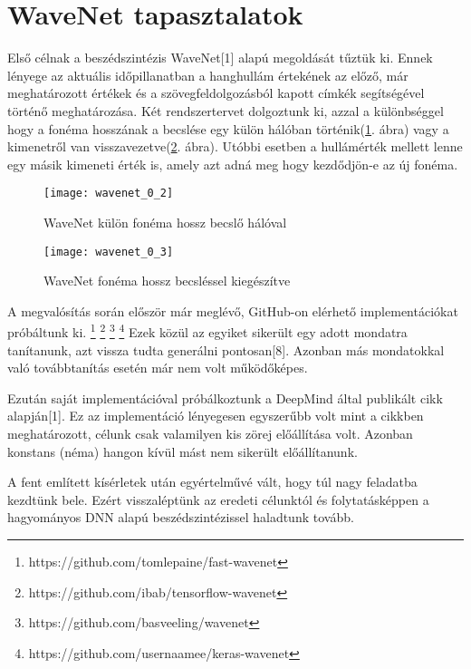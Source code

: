 \section{WaveNet tapasztalatok}

Első célnak a beszédszintézis WaveNet[1] alapú megoldását tűztük ki. Ennek lényege az aktuális időpillanatban a hanghullám értekének az előző, már meghatározott értékek és a szövegfeldolgozásból kapott címkék segítségével történő meghatározása. Két rendszertervet dolgoztunk ki, azzal a különbséggel hogy a fonéma hosszának a becslése egy külön hálóban történik(\ref{wavenet-1}. ábra) vagy a kimenetről van visszavezetve(\ref{wavenet-2}. ábra). Utóbbi esetben a hullámérték mellett lenne egy másik kimeneti érték is, amely azt adná meg hogy kezdődjön-e az új fonéma.

\begin{figure}[h]
	\par
	\centering
	\medskip
	\texttt{[image: wavenet\_0\_2]}
	\caption{WaveNet külön fonéma hossz becslő hálóval}
	\label{wavenet-1}
\end{figure}
\begin{figure}[h]
	\par\centering\medskip
	\texttt{[image: wavenet\_0\_3]}
	\caption{WaveNet fonéma hossz becsléssel kiegészítve}
	\label{wavenet-2}
\end{figure}

A megvalósítás során először már meglévő, GitHub-on elérhető implementációkat próbáltunk ki.
\footnote{https://github.com/tomlepaine/fast-wavenet}
\footnote{https://github.com/ibab/tensorflow-wavenet}
\footnote{https://github.com/basveeling/wavenet}
\footnote{https://github.com/usernaamee/keras-wavenet}
Ezek közül az egyiket sikerült egy adott mondatra tanítanunk, azt vissza tudta generálni pontosan[8]. Azonban más mondatokkal való továbbtanítás esetén már nem volt működőképes.

Ezután saját implementációval próbálkoztunk a DeepMind által publikált cikk alapján[1]. Ez az implementáció lényegesen egyszerűbb volt mint a cikkben meghatározott, célunk csak valamilyen kis zörej előállítása volt. Azonban konstans (néma) hangon kívül mást nem sikerült előállítanunk.

A fent említett kísérletek után egyértelművé vált, hogy túl nagy feladatba kezdtünk bele. Ezért visszaléptünk az eredeti célunktól és folytatásképpen a hagyományos DNN alapú beszédszintézissel haladtunk tovább.
